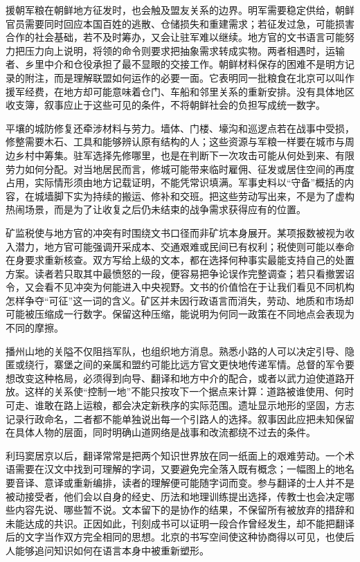 援朝军粮在朝鲜地方征发时，也会触及盟友关系的边界。明军需要稳定供给，朝鲜官员需要同时回应本国百姓的逃散、仓储损失和重建需求；若征发过急，可能损害合作的社会基础，若不及时筹办，又会让驻军难以继续。地方官的文书语言可能努力把压力向上说明，将领的命令则要求把抽象需求转成实物。两者相遇时，运输者、乡里中介和仓役承担了最不显眼的交接工作。朝鲜材料保存的困难不是明方记录的附注，而是理解联盟如何运作的必要一面。它表明同一批粮食在北京可以叫作援军经费，在地方却可能意味着仓门、车船和邻里关系的重新安排。没有具体地区收支簿，叙事应止于这些可见的条件，不将朝鲜社会的负担写成统一数字。

平壤的城防修复还牵涉材料与劳力。墙体、门楼、壕沟和巡逻点若在战事中受损，修整需要木石、工具和能够辨认原有结构的人；这些资源与军粮一样要在城市与周边乡村中筹集。驻军选择先修哪里，也是在判断下一次攻击可能从何处到来、有限劳力如何分配。对当地居民而言，修城可能带来临时雇佣、征发或居住空间的再度占用，实际情形须由地方记载证明，不能凭常识填满。军事史料以“守备”概括的内容，在城墙脚下实为持续的搬运、修补和交班。把这些劳动写出来，不是为了虚构热闹场景，而是为了让收复之后仍未结束的战争需求获得应有的位置。

矿监税使与地方官的冲突有时围绕文书口径而非矿坑本身展开。某项报数被视为收入潜力，地方官可能强调开采成本、交通艰难或民间已有权利；税使则可能以奉命在身要求重新核查。双方写给上级的文本，都在选择何种事实最能支持自己的处置方案。读者若只取其中最愤怒的一段，便容易把争论误作完整调查；若只看撤罢诏令，又会看不见冲突为何能进入中央视野。文书的价值恰在于让我们看见不同机构怎样争夺“可征”这一词的含义。矿区并未因行政语言而消失，劳动、地质和市场却可能被压缩成一行数字。保留这种压缩，能说明为何同一政策在不同地点会表现为不同的摩擦。

播州山地的关隘不仅阻挡军队，也组织地方消息。熟悉小路的人可以决定引导、隐匿或绕行，寨堡之间的亲属和盟约可能比远方官文更快地传递军情。总督的军令要想改变这种格局，必须得到向导、翻译和地方中介的配合，或者以武力迫使道路开放。这样的关系使“控制一地”不能只按攻下一个据点来计算：道路被谁使用、何时可走、谁敢在路上运粮，都会决定新秩序的实际范围。遗址显示地形的坚固，方志记录行政命名，二者都不能单独说出每一个引路人的选择。叙事因此应把未知保留在具体人物的层面，同时明确山道网络是战事和改流都绕不过去的条件。

利玛窦居京以后，翻译常常是把两个知识世界放在同一纸面上的艰难劳动。一个术语需要在汉文中找到可理解的字词，又要避免完全落入既有概念；一幅图上的地名要音译、意译或重新编排，读者的理解便可能随字词而变。参与翻译的士人并不是被动接受者，他们会以自身的经史、历法和地理训练提出选择，传教士也会决定哪些内容先说、哪些暂不说。文本留下的是协作的结果，不保留所有被放弃的措辞和未能达成的共识。正因如此，刊刻成书可以证明一段合作曾经发生，却不能把翻译后的文字当作双方完全相同的思想。北京的书写空间使这种协商得以可见，也使后人能够追问知识如何在语言本身中被重新塑形。

